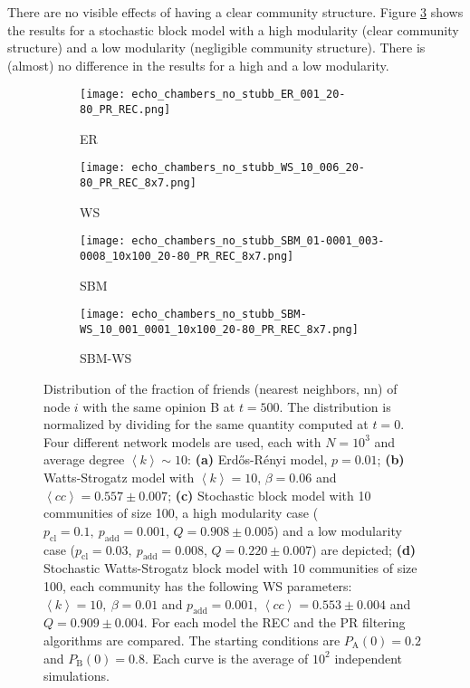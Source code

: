 \documentclass[11 pt , letterpaper , twoside , openright]{book}
\begin{document}
\newline
There are no visible effects of having a clear community structure. Figure \ref{sbm} shows the results for a stochastic block model with a high modularity (clear community structure) and a low modularity (negligible community structure). There is (almost) no difference in the results for a high and a low modularity.
\newpage
\begin{figure}[H]
  \begin{subfigure}[b]{0.49\textwidth}
    \caption{ER}
  	\texttt{[image: echo\_chambers\_no\_stubb\_ER\_001\_20-80\_PR\_REC.png]}
    \label{er_echo_20-80}
  \end{subfigure}
  \begin{subfigure}[b]{0.49\textwidth}
    \caption{WS}
  	\texttt{[image: echo\_chambers\_no\_stubb\_WS\_10\_006\_20-80\_PR\_REC\_8x7.png]}
    \label{ws}
  \end{subfigure}
  \begin{subfigure}[b]{0.49\textwidth}
    \caption{SBM}
    \texttt{[image: echo\_chambers\_no\_stubb\_SBM\_01-0001\_003-0008\_10x100\_20-80\_PR\_REC\_8x7.png]}
  	\label{sbm}    
  \end{subfigure}
  \begin{subfigure}[b]{0.49\textwidth}
    \caption{SBM-WS}
    \texttt{[image: echo\_chambers\_no\_stubb\_SBM-WS\_10\_001\_0001\_10x100\_20-80\_PR\_REC\_8x7.png]}
    \label{sbm-ws}
  \end{subfigure}
  \captionsetup{format=plain}
  \caption[Distribution of the fraction of friends (nearest neighbors, nn) of node $i$ with the same opinion B at $t=500$, $\left<P_\text{B}^{\text{nn}}\right>$, for an initial $20/80$ opinion distribution.]{Distribution of the fraction of friends (nearest neighbors, nn) of node $i$ with the same opinion B at $t = 500$. The distribution is normalized by dividing for the same quantity computed at $t=0$. Four different network models are used, each with $N = 10^3$ and average degree $\left<k\right> \sim 10$: \textbf{(a)} Erd\H{o}s-R\'{e}nyi model, $p=0.01$; \textbf{(b)} Watts-Strogatz model with $\left<k\right> = 10$, $\beta = 0.06$ and $\left<cc\right> = 0.557 \pm 0.007$; \textbf{(c)} Stochastic block model with 10 communities of size 100, a high modularity case ($p_{\text{cl}} = 0.1,\ p_{\text{add}} = 0.001$, $Q = 0.908 \pm 0.005$) and a low modularity case ($p_{\text{cl}} = 0.03,\ p_{\text{add}} = 0.008$, $Q = 0.220 \pm 0.007$) are depicted; \textbf{(d)} Stochastic Watts-Strogatz block model with 10 communities of size 100, each community has the following WS parameters: $\left<k\right> = 10,\ \beta = 0.01$ and $p_{\text{add}} = 0.001$, $\left<cc\right> = 0.553 \pm 0.004$ and $Q = 0.909 \pm 0.004$. For each model the REC and the PR filtering algorithms are compared. The starting conditions are $P_\text{A}(0) = 0.2$ and $P_\text{B}(0) = 0.8$. Each curve is the average of $10^2$ independent simulations.}
\label{echo_20_80}
\end{figure}
\end{document}
